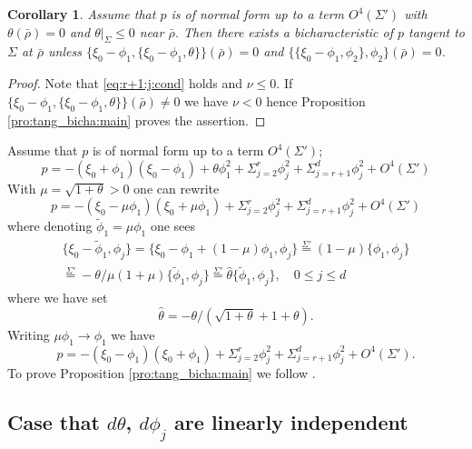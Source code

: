 \documentclass[12pt,leqno]{article} %
\def\sieq{\overset{\Sigma'}{=}}
\def\bro{\bar\rho}
\def\bro{\bar\rho}
\numberwithin{equation}{section}
\newtheorem{cor}{Corollary}[section]
\begin{document}
%
%
\begin{cor}
\label{cor:te:futeiti} Assume that $p$ is of normal form up to a term $O^4(\Sigma')$ with $\theta(\bro)=0$ and $\theta|_{\Sigma}\leq 0$ near $\bro$. Then there exists a bicharacteristic of $p$ tangent to $\Sigma$ at $\bro$ unless $\{\xi_0-\phi_1,\{\xi_0-\phi_1,\theta\}\}(\bro)= 0$ and $\{\{\xi_0-\phi_1,\phi_2\},\phi_2\}(\bro)= 0$.
\end{cor}
%
\begin{proof}Note that \eqref{eq:r+1:j:cond} holds and $\nu\leq 0$.  If $\{\xi_0-\phi_1,\{\xi_0-\phi_1,\theta\}\}(\bro)\neq 0$ we have $\nu<0$ hence Proposition \ref{pro:tang_bicha:main} proves the assertion.
\end{proof}
%
Assume that $p$ is of normal form up to a term $O^4(\Sigma')$;
%
\begin{equation}
\label{eq:p:O4}
p=-(\xi_0+\phi_1)(\xi_0-\phi_1)+\theta\phi_1^2+\Sigma_{j=2}^r\phi_j^2+\Sigma_{j=r+1}^d\phi_j^2+O^4(\Sigma')
\end{equation}
%
With $\mu=\sqrt{1+\theta}>0$ one can rewrite
%
\[
p=-(\xi_0-\mu \phi_1)(\xi_0+\mu\phi_1)+\Sigma_{j=2}^r\phi_j^2+\Sigma_{j=r+1}^d\phi_j^2+O^4(\Sigma')
\]
%
where denoting $\tilde\phi_1=\mu \phi_1$ one sees
%
\begin{gather*}
\{\xi_0-\tilde\phi_1, \phi_j\}=\{\xi_0-\phi_1+(1-\mu)\phi_1,\phi_j\}\sieq (1-\mu)\{\phi_1,\phi_j\}\\
\sieq -\theta/\mu(1+\mu)\{\tilde\phi_1,\phi_j\}\sieq \hat\theta\{\tilde\phi_1,\phi_j\},\quad 0\leq j\leq d
\end{gather*}
%
where we have set 
%
\begin{equation}
\label{eq:te:te}
\hat\theta=-\theta/(\sqrt{1+\theta}+1+\theta).
\end{equation}
%
Writing $\mu\phi_1\to\phi_1$ we have
%
\[
p=-(\xi_0-\phi_1)(\xi_0+\phi_1)+\Sigma_{j=2}^r\phi_j^2+\Sigma_{j=r+1}^d\phi_j^2+O^4(\Sigma').
\]
%
To prove Proposition \ref{pro:tang_bicha:main} we follow \cite[Chapter 3]{MR3726883}.





\subsection{Case that $d\theta$, $d\phi_j$ are linearly independent}
\label{sec:indep}
\end{document}
